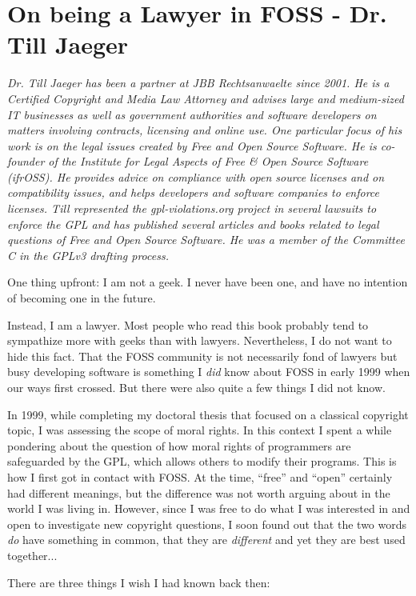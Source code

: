 \chapter{On being a Lawyer in FOSS - Dr. Till Jaeger} 

\textit{Dr. Till Jaeger has been a partner at JBB Rechtsanwaelte since 2001. He
is a Certified Copyright and Media Law Attorney and advises large and
medium-sized IT businesses as well as government authorities and software
developers on matters involving contracts, licensing and online use. One
particular focus of his work is on the legal issues created by Free and Open
Source Software. He is co-founder of the Institute for Legal Aspects of Free \&
Open Source Software (ifrOSS). He provides advice on compliance with open source licenses and on
compatibility issues, and helps developers and software companies to enforce
licenses. Till represented the gpl-violations.org project in several lawsuits to enforce
the GPL and has published several articles and books related to legal questions
of Free and Open Source Software. He was a member of the Committee C in the
GPLv3 drafting process.}

One thing upfront: I am not a geek. I never have been one, and have no intention
of becoming one in the future. 

Instead, I am a lawyer. Most people who read this book probably tend to
sympathize more with geeks than with lawyers. Nevertheless, I do not want to
hide this fact. That the FOSS community is not necessarily fond of lawyers but
busy developing software is something I \textit{did} know about FOSS in early
1999 when our ways first crossed. But there were also quite a few things I did
not know.

In 1999, while completing my doctoral thesis that focused on a classical
copyright topic, I was assessing the scope of moral rights. In this context I
spent a while pondering about the question of how moral rights of programmers
are safeguarded by the GPL, which allows others to modify their programs. This
is how I first got in contact with FOSS. At the time, ``free'' and ``open''
certainly had different meanings, but the difference was not worth arguing
about in the world I was living in. However, since I was free to do what I was
interested in and open to investigate new copyright questions, I soon found out
that the two words \textit{do} have something in common, that they are
\textit{different} and yet they are best used together...

There are three things I wish I had known back then:

